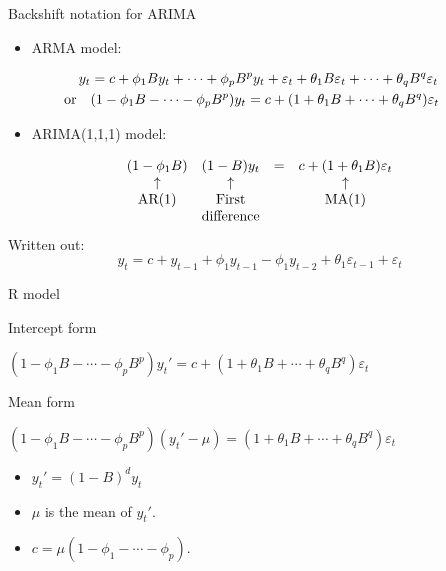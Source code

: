 \documentclass[14pt,ignorenonframetext,]{beamer}
\providecommand{\tightlist}{%
  \setlength{\itemsep}{0pt}\setlength{\parskip}{0pt}}
\begin{document}
\begin{frame}{Backshift notation for ARIMA}

\begin{itemize}
\item
  ARMA model:\vspace*{-1cm}\newline
  \parbox{12cm}{\small\begin{align*}
  \hspace*{-1cm} 
  y_{t}  &=  c + \phi_{1}By_{t} + \cdots + \phi_pB^py_{t}
         +  \varepsilon_{t}  +  \theta_{1}B\varepsilon_{t} + \cdots + \theta_qB^q\varepsilon_{t} \\
  \hspace*{-1cm} 
  \text{or}\quad & (1-\phi_1B - \cdots - \phi_p B^p) y_t = c + (1 + \theta_1 B + \cdots + \theta_q B^q)\varepsilon_t
  \end{align*}}
\item
  ARIMA(1,1,1) model:
\end{itemize}

\[
\begin{array}{c c c c}
(1 - \phi_{1} B) & (1  -  B) y_{t} &= &c + (1  + \theta_{1} B) \varepsilon_{t}\\
{\uparrow}  & {\uparrow}    &   &{\uparrow}\\
{\text{AR(1)}} & {\text{First}}   &     &{\text{MA(1)}}\\
& {\hbox to 0cm{\hss\text{difference}\hss}}\\
\end{array}
\]\pause
Written out:
\[y_t =   c + y_{t-1} + \phi_1 y_{t-1}- \phi_1 y_{t-2} + \theta_1\varepsilon_{t-1} + \varepsilon_t \]

\end{frame}

\begin{frame}{R model}

\fontsize{13}{16}\sf

\begin{block}{Intercept form}
\centerline{$(1-\phi_1B - \cdots - \phi_p B^p) y_t' = c + (1 + \theta_1 B + \cdots + \theta_q B^q)\varepsilon_t$}
\end{block}

\begin{block}{Mean form}
\centerline{$(1-\phi_1B - \cdots - \phi_p B^p)(y_t' - \mu) = (1 + \theta_1 B + \cdots + \theta_q B^q)\varepsilon_t$}
\end{block}

\begin{itemize}
\tightlist
\item
  \(y_t' = (1-B)^d y_t\)
\item
  \(\mu\) is the mean of \(y_t'\).
\item
  \(c = \mu(1-\phi_1 - \cdots - \phi_p )\).
\end{itemize}

\end{frame}
\end{document}
